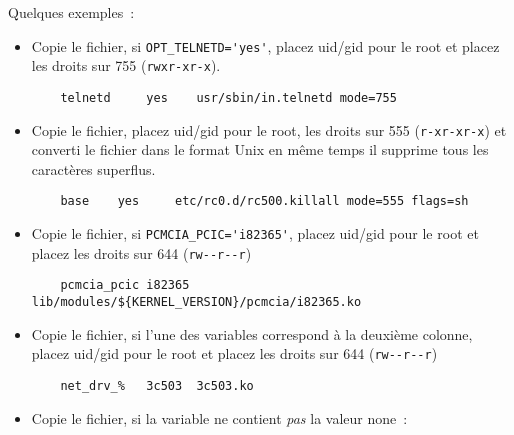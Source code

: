    Quelques exemples~:

    \begin{itemize}
    \item Copie le fichier, si \verb+OPT_TELNETD='yes'+,
      placez uid/gid pour le root et placez les droits sur 755 (\verb?rwxr-xr-x?).

\begin{example}
\begin{verbatim}
    telnetd     yes    usr/sbin/in.telnetd mode=755
\end{verbatim}
\end{example}

    \item Copie le fichier, placez uid/gid pour le root, les droits sur 555
      (\verb?r-xr-xr-x?) et converti le fichier dans le format Unix en même
      temps il supprime tous les caractères superflus.

\begin{example}
\begin{verbatim}
    base    yes     etc/rc0.d/rc500.killall mode=555 flags=sh
\end{verbatim}
\end{example}

    \item Copie le fichier, si \verb+PCMCIA_PCIC='i82365'+, placez
      uid/gid pour le root et placez les droits sur 644 (\verb?rw--r--r?)

\begin{example}
\begin{verbatim}
    pcmcia_pcic i82365 lib/modules/${KERNEL_VERSION}/pcmcia/i82365.ko
\end{verbatim}
\end{example}

         \item Copie le fichier, si l'une des variables  correspond à la
           deuxième colonne, placez uid/gid pour le root et placez les droits
           sur 644 (\verb?rw--r--r?)

\begin{example}
\begin{verbatim}
    net_drv_%   3c503  3c503.ko
\end{verbatim}
\end{example}

        \item Copie le fichier, si la variable  ne contient
		\emph{pas} la valeur \og{}none\fg{}~:


\end{itemize}
